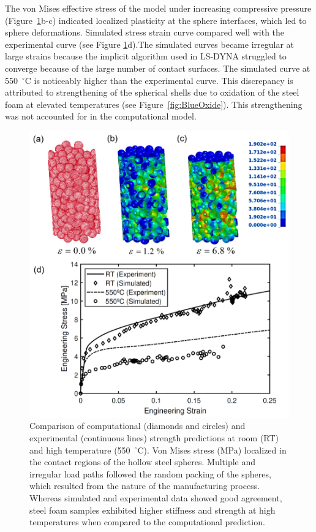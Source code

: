 \documentclass[review]{elsarticle}
\begin{document}
The von Mises effective stress of the model under increasing compressive pressure (Figure~\ref{Figure5}b-c) indicated localized plasticity at the sphere interfaces, which led to sphere deformations. Simulated stress strain curve compared well with the experimental curve (see Figure \ref{Figure5}d).The simulated curves became irregular at large strains because the implicit algorithm used in LS-DYNA struggled to converge because of the large number of contact surfaces. The simulated curve at 550~$^\circ\mathrm{C}$ is noticeably higher than the experimental curve. This discrepancy is attributed to strengthening of the spherical shells due to oxidation of the steel foam at elevated temperatures (see Figure~\ref{fig:BlueOxide}). This strengthening was not accounted for in the computational model.

\begin{figure}[htbp]
	\begin{center}
		\includegraphics[width=0.75\linewidth]
		{Tex-Figures/Fig10-SimulatedCompression}
		\caption{Comparison of computational (diamonds and circles) and experimental (continuous lines) strength predictions at room (RT) and high temperature (550~$^\circ\mathrm{C}$). Von Mises stress (MPa) localized in the contact regions of the hollow steel spheres. Multiple and irregular load paths followed the random packing of the spheres, which resulted from the nature of the manufacturing process. Whereas simulated and experimental data showed good agreement, steel foam samples exhibited higher stiffness and strength at high temperatures when compared to the computational prediction.}
		\label{Figure5}
	\end{center}
\end{figure}
\end{document}
